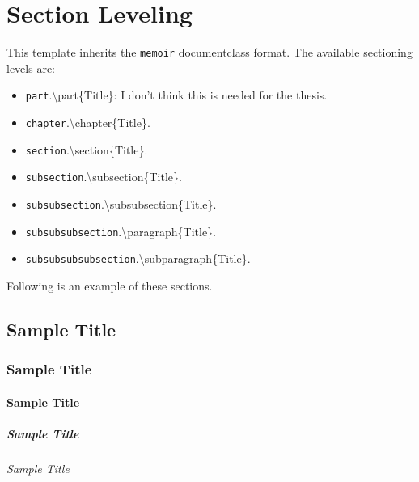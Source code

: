 \chapter{Section Leveling}\label{chapter:leveling}

This template inherits the \texttt{memoir} documentclass format.
The available sectioning levels are:

\begin{itemize}
	\item{\texttt{part}.\qquad\textbackslash part\{Title\}: I don't think this is needed for the thesis.}
	\item{\texttt{chapter}.\qquad\textbackslash chapter\{Title\}.}
	\item{\texttt{section}.\qquad\textbackslash section\{Title\}.}
	\item{\texttt{subsection}.\qquad\textbackslash subsection\{Title\}.}
	\item{\texttt{subsubsection}.\qquad\textbackslash subsubsection\{Title\}.}
	\item{\texttt{subsubsubsection}.\qquad\textbackslash paragraph\{Title\}.}
	\item{\texttt{subsubsubsubsection}.\qquad\textbackslash subparagraph\{Title\}.}
\end{itemize}

\newpage
Following is an example of these sections. 

\section{Sample Title}

\subsection{Sample Title}


\subsubsection{Sample Title}


\paragraph{Sample Title}


\subparagraph{Sample Title}
